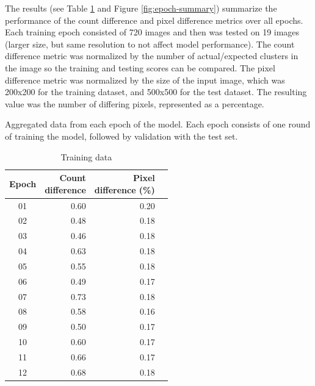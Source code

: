 \documentclass{article}
\begin{document}
The results (see Table \ref{tbl:epoch-summary} and Figure 
\ref{fig:epoch-summary}) summarize the performance of the count difference 
and pixel difference metrics over all epochs. Each training epoch consisted 
of 720 images and then was tested on 19 images (larger size, but same 
resolution to not affect model performance). The count difference metric was 
normalized by the number of actual/expected clusters in the image so the 
training and testing scores can be compared. The pixel difference metric was 
normalized by the size of the input image, which was 200x200 for the training 
dataset, and 500x500 for the test dataset. The resulting value was the number 
of differing pixels, represented as a percentage.

\begin{table}[ht]
  \captionsetup{width=\textwidth}
  \caption{Aggregated data from each epoch of the model. Each epoch consists 
  of one round of training the model, followed by validation with the test set.}
  \label{tbl:epoch-summary}
  \centering
  \begin{subtable}{0.5\textwidth}
    \caption{Training data}
    \begin{tabular}{crrr}
      \toprule
      Epoch & \shortstack{Count \\ difference} & \shortstack{Pixel \\ difference (\%)} \\
      \midrule
        01  &             0.60 &             0.20 \\
        02  &             0.48 &             0.18 \\
        03  &             0.46 &             0.18 \\
        04  &             0.63 &             0.18 \\
        05  &             0.55 &             0.18 \\
        06  &             0.49 &             0.17 \\
        07  &             0.73 &             0.18 \\
        08  &             0.58 &             0.16 \\
        09  &             0.50 &             0.17 \\
        10  &             0.60 &             0.17 \\
        11  &             0.66 &             0.17 \\
        12  &             0.68 &             0.18 \\
      \bottomrule
    \end{tabular}

\end{subtable}
\end{table}
\end{document}

